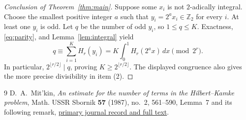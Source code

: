 \documentclass[11pt]{article}
\newcommand{\Zii}{\mathbb Z_2}
\begin{document}
\begin{proof}[Conclusion of Theorem~\ref{thm:main}]
Suppose some $x_i$ is not $2$-adically integral. Choose the smallest
positive integer $a$ such that $y_i=2^a x_i\in\Zii$ for every $i$.
At least one $y_i$ is odd. Let $q$ be the number of odd $y_i$, so
$1\leq q\leq K$. Exactness, \eqref{eq:parity}, and
Lemma~\ref{lem:integral} yield
\[
 q\equiv\sum_{i=1}^K H_r(y_i)
   =K\int_0^1 H_r(2^a x)\,dx\pmod{2^r}.
\]
In particular, $2^{\lfloor r/2\rfloor}\mid q$, proving $K\geq2^{\lfloor r/2\rfloor}$.
The displayed congruence also gives the more precise divisibility in item (2).
\end{proof}

\begin{thebibliography}{9}
 D.~A.~Mit'kin, \emph{An estimate for the number of terms in the Hilbert--Kamke problem}, Math. USSR Sbornik \textbf{57} (1987), no.~2, 561--590, Lemma~7 and its following remark, \href{https://www.mathnet.ru/eng/sm1845}{primary journal record and full text}.
\end{thebibliography}
\end{document}
